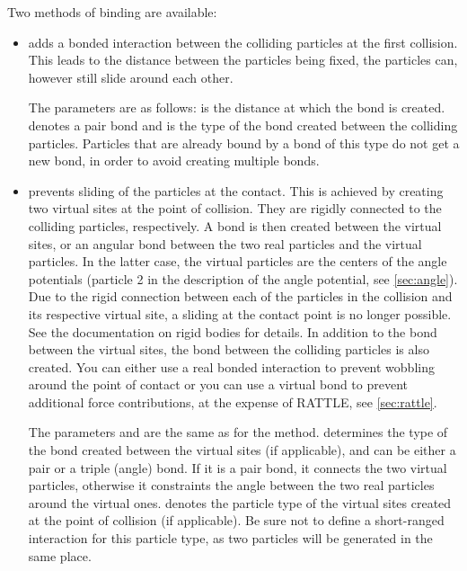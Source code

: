 Two methods of binding are available:
\begin{itemize}
\item {} adds a bonded interaction between the
  colliding particles at the first collision. This leads to the
  distance between the particles being fixed, the particles can,
  however still slide around each other.

  The parameters are as follows:  is the distance at which the
  bond is created.  denotes a pair bond and is the type of
  the bond created between the colliding particles. Particles that are
  already bound by a bond of this type do not get a new bond, in order
  to avoid creating multiple bonds.

\item {} prevents sliding of the
  particles at the contact. This is achieved by creating two virtual
  sites at the point of collision. They are rigidly connected to the
  colliding particles, respectively. A bond is then created between
  the virtual sites, or an angular bond between the two real particles
  and the virtual particles. In the latter case, the virtual particles
  are the centers of the angle potentials (particle 2 in the
  description of the angle potential, see \ref{sec:angle}). Due to the
  rigid connection between each of the particles in the collision and
  its respective virtual site, a sliding at the contact point is no
  longer possible.  See the documentation on rigid bodies for
  details. In addition to the bond between the virtual sites, the bond
  between the colliding particles is also created. You can either use
  a real bonded interaction to prevent wobbling around the point of
  contact or you can use a virtual bond to prevent additional force
  contributions, at the expense of RATTLE, see \ref{sec:rattle}.

  The parameters  and  are the same as for the
   method.  determines the type of the
  bond created between the virtual sites (if applicable), and can be
  either a pair or a triple (angle) bond. If it is a pair bond, it
  connects the two virtual particles, otherwise it constraints the
  angle between the two real particles around the virtual
  ones.  denotes the particle type of the virtual sites
  created at the point of collision (if applicable). Be sure not to
  define a short-ranged interaction for this particle type, as two
  particles will be generated in the same place.


\end{itemize}
